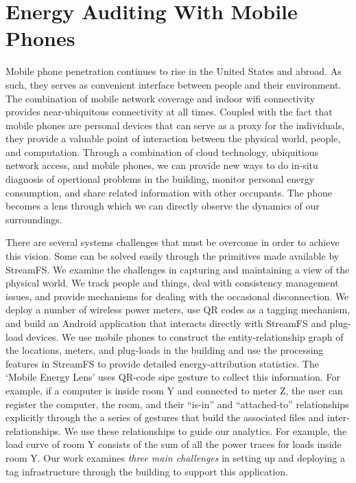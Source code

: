\section{Energy Auditing With Mobile Phones} 
\label{sec:mobileaudit}

Mobile phone penetration continues to rise in the United States and abroad.
As such, they serves as convenient interface between people and their environment.  
The combination of mobile network coverage and indoor wifi connectivity provides near-ubiquitous
connectivity at all times.  Coupled with the fact that mobile phones are personal devices that can serve as a proxy 
for the individuals, they provide a valuable point of interaction between the physical world, people, and
computation.  Through a combination of cloud technology, ubiquitious network access, and mobile phones, 
we can provide new ways to do in-situ diagnosis of opertional problems in the building, monitor personal energy consumption, 
and share related information with other occupants.  The phone becomes a lens through which we can directly observe the dynamics 
of our surroundings.

There are several systems challenges that must be overcome in order to achieve this vision.  Some can be solved easily 
through the primitives made available by StreamFS.  
We examine the challenges in capturing and maintaining a view of the physical world.  We track people and things,
deal with consistency management issues, and provide mechanisms for dealing with the occasional disconnection.
We deploy a number of
wireless power meters, use QR codes as a tagging mechanism, and build an Android application that interacts directly with
StreamFS and plug-load devices.
We use mobile phones to construct the entity-relationship 
graph of the locations, meters, and plug-loads in the building and use the processing features in StreamFS to provide detailed energy-attribution
statistics.  The `Mobile Energy Lens' uses QR-code sipe gesture to collect this information.  For example, if a computer is inside 
room Y and connected to meter Z, the user can register the computer, the room, and their ``is-in'' and ``attached-to'' relationships
explicitly through the a series of gestures that build the associated files and inter-relationships.  
We use these relationships to guide our analytics.
For example, the load curve of room Y consists of the sum of all the power traces for loads
inside room Y.  Our work examines \emph{three main challenges} in setting up and deploying a tag infrastructure through the building to 
support this application.

